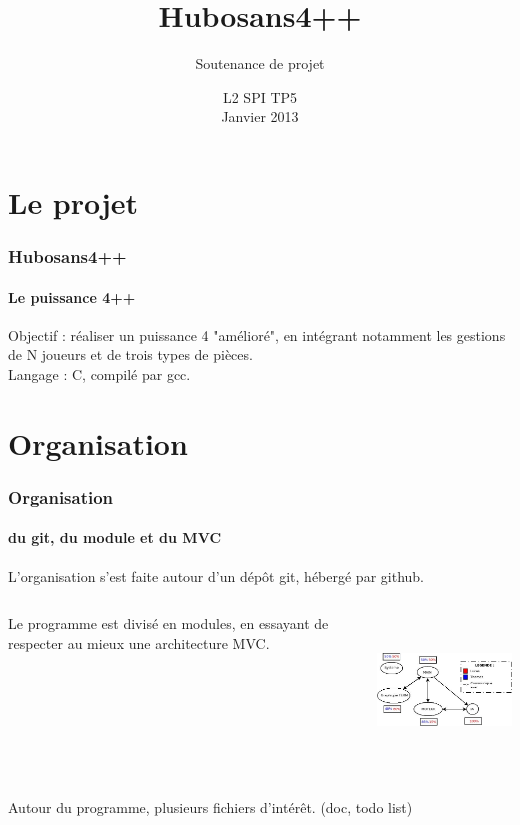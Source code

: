 \documentclass{beamer}
\title{Hubosans4++}
\subtitle{Soutenance de projet}
\author{}
\date{L2 SPI TP5\\ Janvier 2013}
\begin{document}
    \frame{\titlepage}


    \section{Le projet}
    \begin{frame}
    \frametitle{Hubosans4++}
    \framesubtitle{Le puissance 4++}
        Objectif : réaliser un puissance 4 "amélioré", 
            en intégrant notamment les gestions de N joueurs 
            et de trois types de pièces. \\     
        \vspace{2cm} %
        Langage : C, compilé par gcc. \\
    \end{frame}



    \section{Organisation}
    \begin{frame}
    \frametitle{Organisation}
    \framesubtitle{du git, du module et du MVC}
        L'organisation s'est faite autour d'un dépôt git, 
            hébergé par github.  
        \vspace{1cm} %
        \begin{columns}[c] %
            \begin{column}{5cm} %
                Le programme est divisé en modules, en essayant 
                    de respecter au mieux une architecture MVC. 
            \end{column}
            \begin{column}{7cm} %
                \includegraphics[width=6cm, height=4cm]{ressources/presentation/archi_projet.jpeg}
            \end{column}
        \end{columns}
        \vspace{1cm} %
        Autour du programme, plusieurs fichiers d'intérêt.
            (doc, todo list)
    \end{frame}
\end{document}
